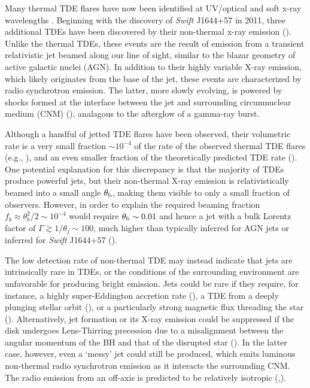 \documentclass[usenatbib,fleqn]{mnras}
\begin{document}
Many thermal TDE flares have now been identified at UV/optical
\citep{van-Velzen+2011, Gezari+2012, Chornock+2014, Arcavi+2014} and
soft x-ray wavelengths \citep{Esquej+2007}.  Beginning with the
discovery of {\it Swift} J1644+57 in 2011, three additional TDEs have
been discovered by their non-thermal x-ray emission
(\citealt{Bloom+2011, Levan+2011, Burrows+2011, Zauderer+2011,
  Cenko+2012, Pasham+2015, Brown+2015}).  Unlike the thermal TDEs,
these events are the result of emission from a transient relativistic
jet beamed along our line of sight, similar to the blazar geometry of
active galactic nuclei (AGN).  In addition to their highly variable
X-ray emission, which likely originates from the base of the jet,
these events are characterized by radio synchrotron emission.  The
latter, more slowly evolving, is powered by shocks formed at the
interface between the jet and surrounding circumnuclear medium (CNM)
(\citealt{Giannios&Metzger2011,Metzger+2012}), analagous to the
afterglow of a gamma-ray burst.

Although a handful of jetted TDE flares have been observed, their
volumetric rate is a very small fraction $\sim 10^{-4}$ of the rate of
the observed thermal TDE flares (e.g., \citealt{Burrows+2011}), and an
even smaller fraction of the theoretically predicted TDE rate
(\citealt{Stone&Metzger2015}).  One potential explanation for this
discrepancy is that the majority of TDEs produce powerful jets, but
their non-thermal X-ray emission is relativistically beamed into a
small angle $\theta_{\rm b}$, making them visible to only a small
fraction of observers.  However, in order to explain the required
beaming fraction $f_b \approx \theta_{b}^{2}/2 \sim 10^{-4}$ would
require $\theta_{\rm b} \sim 0.01$ and hence a jet with a bulk Lorentz
factor of $\Gamma \gtrsim 1/\theta_j \sim 100$, much higher than
typically inferred for AGN jets or inferred for {\it Swift} J1644+57
(\citealt{Metzger+2012}).

The low detection rate of non-thermal TDE may instead indicate that
jets are intrinsically rare in TDEs, or the conditions of the
surrounding environment are unfavorable for producing bright emission.
Jets could be rare if they require, for instance, a highly
super-Eddington accretion rate (\citealt{De-Colle+2012}), a TDE from a
deeply plunging stellar orbit (\citealt{Metzger&Stone2015}), or a
particularly strong magnetic flux threading the star
(\citealt{Tchekhovskoy+2014,Kelley+2014}).  Alternatively, jet formation
or its X-ray emission could be suppressed if the disk undergoes
Lens-Thirring precession due to a misalignment between the angular
momentum of the BH and that of the disrupted star
(\citealt{Stone&Loeb2012}).  In the latter case, however, even a `messy'
jet could still be produced, which emits luminous non-thermal radio
synchrotron emission as it interacts the surrounding CNM.  The radio
emission from an off-axis is predicted to be relatively isotropic
(\citealt{Giannios&Metzger2011},\citealt{Mimica+2015}).
\end{document}
